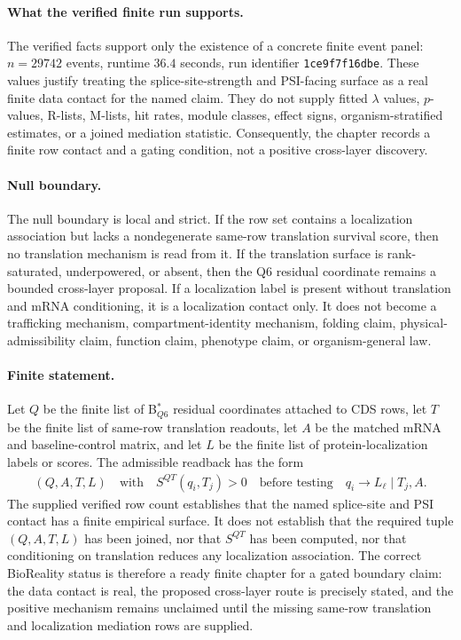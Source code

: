 \paragraph{What the verified finite run supports.}
The verified facts support only the existence of a concrete finite event panel: $n=29742$ events, runtime $36.4$ seconds, run identifier \texttt{1ce9f7f16dbe}.  These values justify treating the splice-site-strength and PSI-facing surface as a real finite data contact for the named claim.  They do not supply fitted $\lambda$ values, $p$-values, R-lists, M-lists, hit rates, module classes, effect signs, organism-stratified estimates, or a joined mediation statistic.  Consequently, the chapter records a finite row contact and a gating condition, not a positive cross-layer discovery.

\paragraph{Null boundary.}
The null boundary is local and strict.  If the row set contains a localization association but lacks a nondegenerate same-row translation survival score, then no translation mechanism is read from it.  If the translation surface is rank-saturated, underpowered, or absent, then the Q6 residual coordinate remains a bounded cross-layer proposal.  If a localization label is present without translation and mRNA conditioning, it is a localization contact only.  It does not become a trafficking mechanism, compartment-identity mechanism, folding claim, physical-admissibility claim, function claim, phenotype claim, or organism-general law.

\paragraph{Finite statement.}
Let $Q$ be the finite list of B$^{\ast}_{Q6}$ residual coordinates attached to CDS rows, let $T$ be the finite list of same-row translation readouts, let $A$ be the matched mRNA and baseline-control matrix, and let $L$ be the finite list of protein-localization labels or scores.  The admissible readback has the form
$$
\begin{aligned}
(Q,A,T,L) \quad \text{with} \quad S^{QT}(q_i,T_j)>0
\quad \text{before testing} \quad q_i \to L_\ell \mid T_j,A.
\end{aligned}
$$
The supplied verified row count establishes that the named splice-site and PSI contact has a finite empirical surface.  It does not establish that the required tuple $(Q,A,T,L)$ has been joined, nor that $S^{QT}$ has been computed, nor that conditioning on translation reduces any localization association.  The correct BioReality status is therefore a ready finite chapter for a gated boundary claim: the data contact is real, the proposed cross-layer route is precisely stated, and the positive mechanism remains unclaimed until the missing same-row translation and localization mediation rows are supplied.